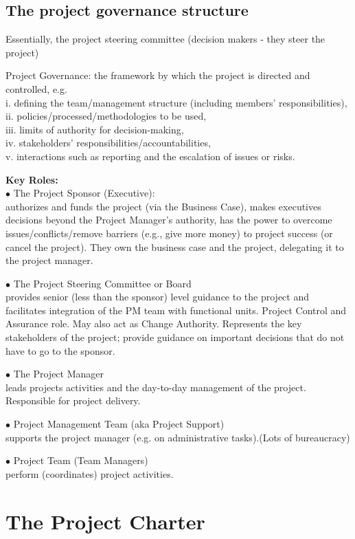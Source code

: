 \documentclass[]{project_plan}
\newcommand{\bulletPoint}{\hspace{-3.1pt}$\bullet$ \hspace{5pt}}
\begin{document}
\subsection{The project governance structure}
Essentially, the project steering committee (decision makers - they steer the project)

Project Governance: the framework by which the project is directed and controlled, e.g.\\
i.   defining the team/management structure (including members' responsibilities),\\
ii.  policies/processed/methodologies to be used,\\
iii. limits of authority for decision-making,\\
iv.  stakeholders’ responsibilities/accountabilities,\\
v.   interactions such as reporting and the escalation of issues or risks.

\textbf{Key Roles:}\\
\bulletPoint The Project Sponsor (Executive):\\
authorizes and funds the project (via the Business Case), makes executives decisions
beyond the Project Manager’s authority, has the power to
overcome issues/conflicts/remove barriers (e.g., give more money) to project success (or cancel the project). They own the business case and the project, delegating it to the project manager.

\bulletPoint The Project Steering Committee or Board\\
provides senior (less than the sponsor) level guidance to the project and facilitates integration of the
PM team with functional units. Project Control and Assurance role. May
also act as Change Authority. Represents the key stakeholders of the project; provide guidance on important decisions that do not have to go to the sponsor.

\bulletPoint The Project Manager\\
leads projects activities and the day-to-day
management of the project. Responsible for project delivery.

\bulletPoint Project Management Team (aka Project Support)\\
supports the project manager (e.g. on administrative tasks).(Lots of bureaucracy)

\bulletPoint Project Team (Team Managers)\\
perform (coordinates) project activities.

\section{The Project Charter}
\end{document}
